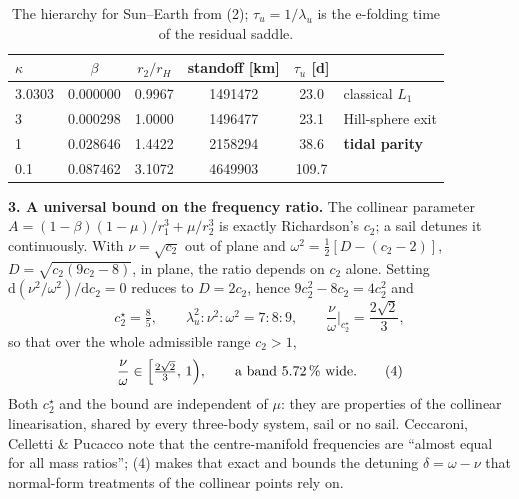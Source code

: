 \documentclass[11pt,a4paper]{article}
\begin{document}
\vspace{-2pt}
\begin{table}[h]
  \centering\small
  \caption{The hierarchy for Sun--Earth from (2); $\tau_u=1/\lambda_u$ is the
  e-folding time of the residual saddle.}
  \vspace{-4pt}
  \begin{tabular}{lccccl}
    \toprule
    $\kappa$ & $\beta$ & $r_2/r_H$ & standoff [\si{\kilo\metre}] & $\tau_u$ [d] & \\
    \midrule
    \num{3.0303} & \num{0.000000} & \num{0.9967} & \num{1491472} & \num{23.0} & classical $L_1$\\
    \num{3}      & \num{0.000298} & \num{1.0000} & \num{1496477} & \num{23.1} & Hill-sphere exit\\
    \num{1}      & \num{0.028646} & \num{1.4422} & \num{2158294} & \num{38.6} & \textbf{tidal parity}\\
    \num{0.1}    & \num{0.087462} & \num{3.1072} & \num{4649903} & \num{109.7} & \\
    \bottomrule
  \end{tabular}
\end{table}

\vspace{-6pt}
\noindent\textbf{3. A universal bound on the frequency ratio.}
The collinear parameter $A=(1-\beta)(1-\mu)/r_1^3+\mu/r_2^3$ is exactly
Richardson's $c_2$; a sail detunes it continuously. With
$\nu=\sqrt{c_2}$ out of plane and $\omega^2=\tfrac12[D-(c_2-2)]$,
$D=\sqrt{c_2(9c_2-8)}$, in plane, the ratio depends on $c_2$ alone. Setting
$\mathrm{d}(\nu^2/\omega^2)/\mathrm{d}c_2=0$ reduces to $D=2c_2$, hence
$9c_2^2-8c_2=4c_2^2$ and
\begin{equation}
  c_2^\star=\tfrac85,\qquad
  \lambda_u^2:\nu^2:\omega^2=7:8:9,\qquad
  \frac{\nu}{\omega}\Big|_{c_2^\star}=\frac{2\sqrt2}{3},
  \tag{3}
\end{equation}
so that over the whole admissible range $c_2>1$,
\begin{equation}
  \frac{\nu}{\omega}\in\Bigl[\tfrac{2\sqrt2}{3},\,1\Bigr),
  \qquad\text{a band \SI{5.72}{\percent} wide.}
  \tag{4}
\end{equation}
Both $c_2^\star$ and the bound are independent of $\mu$: they are properties of
the collinear linearisation, shared by every three-body system, sail or no sail.
Ceccaroni, Celletti \& Pucacco note that the centre-manifold frequencies are
``almost equal for all mass ratios''; (4) makes that exact and bounds the
detuning $\delta=\omega-\nu$ that normal-form treatments of the collinear
points rely on.
\end{document}
